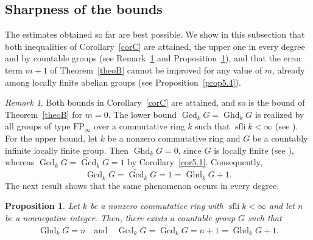 \documentclass[12pt]{amsart}
\newtheorem{proposition}[theorem]{Proposition}
\theoremstyle{remark}
\newtheorem{remark}[theorem]{Remark}
\theoremstyle{definition}
\theoremstyle{plain}
\DeclareMathOperator{\Ghd}{Ghd}
\DeclareMathOperator{\Gcd}{Gcd}
\DeclareMathOperator{\sfli}{sfli}
\newcommand{\PGFcd}{\widetilde{\Gcd}}
\begin{document}
\subsection{Sharpness of the bounds}

The estimates obtained so far are best possible. We show in this subsection that both inequalities of Corollary~\ref{corC} are attained, the upper one in every degree and by countable groups (see Remark~\ref{rem5.2} and Proposition~\ref{prop5.3}), and that the error term $m+1$ of Theorem~\ref{theoB} cannot be improved for any value of $m$, already among locally finite abelian groups (see Proposition~\ref{prop5.4}).

\begin{remark}\label{rem5.2}
Both bounds in Corollary~\ref{corC} are attained, and so is the bound of Theorem~\ref{theoB} for $m=0$. The lower bound $\Gcd_kG=\Ghd_kG$ is realized by all groups of type $\mathrm{FP}_\infty$ over a commutative ring $k$ such that $\sfli k <\infty$ (see \cite[Theorem~B]{St}). For the upper bound, let $k$ be a nonzero commutative ring and $G$ be a countably infinite locally finite group. Then $\Ghd_kG=0$, since $G$ is locally finite (see \cite[Theorem~1.4]{KS}), whereas $\Gcd_kG=\PGFcd_kG=1$ by Corollary~\ref{cor5.1}. Consequently, \[
\Gcd_kG=\PGFcd_kG=1=\Ghd_kG+1 .
\]
The next result shows that the same phenomenon occurs in every degree.
\end{remark}

\begin{proposition}\label{prop5.3}
Let $k$ be a nonzero commutative ring with $\sfli k<\infty$ and let $n$ be a nonnegative integer. Then, there exists a countable group $G$ such that
\[
\Ghd_kG=n
\,\,\,\,\,\,\text{and}\,\,\,\,\,\,
\Gcd_kG=\PGFcd_kG=n+1=\Ghd_kG+1 .
\]
\end{proposition}
\end{document}
